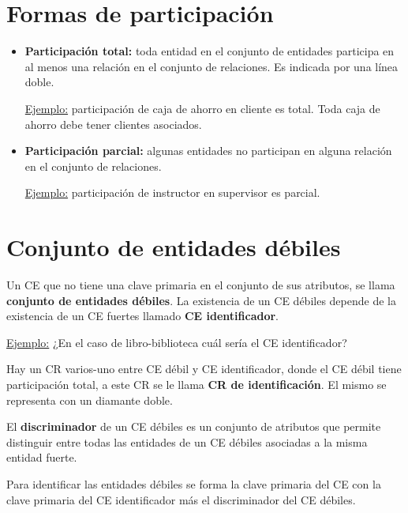 \documentclass[12pt,a4paper]{report}
\begin{document}
	\section{Formas de participación}
		\begin{itemize}
			\item \textbf{Participación total:} toda entidad en el conjunto de entidades participa en al menos una relación en el conjunto de relaciones. Es indicada por una línea doble.
			\par \underline{Ejemplo:} participación de caja de ahorro en cliente es total. Toda caja de ahorro debe tener clientes asociados.
			\item \textbf{Participación parcial:} algunas entidades no participan en alguna relación en el conjunto de relaciones.
			\par \underline{Ejemplo:} participación de instructor en supervisor es parcial.
		\end{itemize}
		
	\section{Conjunto de entidades débiles}
		Un CE que no tiene una clave primaria en el conjunto de sus atributos, se llama \textbf{conjunto de entidades débiles}. La existencia de un CE débiles depende de la existencia de un CE fuertes llamado \textbf{CE identificador}. 
		\vspace{5mm}
		\par \underline{Ejemplo:} ¿En el caso de libro-biblioteca cuál sería el CE identificador?
		\vspace{2.5mm}
		\par Hay un CR varios-uno entre CE débil y CE identificador, donde el CE débil tiene participación total, a este CR se le llama \textbf{CR de identificación}. El mismo se representa con un diamante doble.
		\par El \textbf{discriminador} de un CE débiles es un conjunto de atributos que permite distinguir entre todas las entidades de un CE débiles asociadas a la misma entidad fuerte. 
		\par Para identificar las entidades débiles se forma la clave primaria del CE con la clave primaria del CE identificador más el discriminador del CE débiles.
		
	
		
\end{document}
